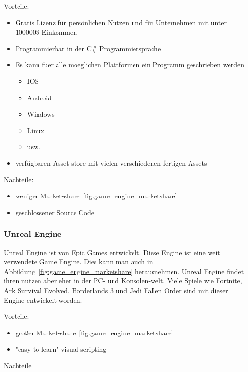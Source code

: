 Vorteile:

\begin{itemize}
    \item Gratis Lizenz für persönlichen Nutzen und für Unternehmen mit unter 100000\$ Einkommen
    \item Programmierbar in der C# Programmiersprache
    \item Es kann fuer alle moeglichen Plattformen ein Programm geschrieben werden
    \begin{itemize}
        \item IOS
        \item Android
        \item Windows
        \item Linux
        \item usw.
    \end{itemize}
    \item verfügbaren Asset-store mit vielen verschiedenen fertigen Assets
\end{itemize}

Nachteile:

\begin{itemize}
    \item weniger Market-share~\ref{fig:game_engine_marketshare}
    \item geschlossener Source Code
\end{itemize}

\subsubsection{Unreal Engine}

Unreal Engine ist von Epic Games entwickelt.
Diese Engine ist eine weit verwendete Game Engine.
Dies kann man auch in Abbildung~\ref{fig:game_engine_marketshare} herausnehmen.
Unreal Engine findet ihren nutzen aber eher in der PC- und Konsolen-welt.
Viele Spiele wie Fortnite, Ark Survival Evolved, Borderlands 3 und Jedi Fallen Order sind mit dieser Engine entwickelt worden.

Vorteile:

\begin{itemize}
    \item großer Market-share~\ref{fig:game_engine_marketshare}
    \item "easy to learn" visual scripting
\end{itemize}

Nachteile

